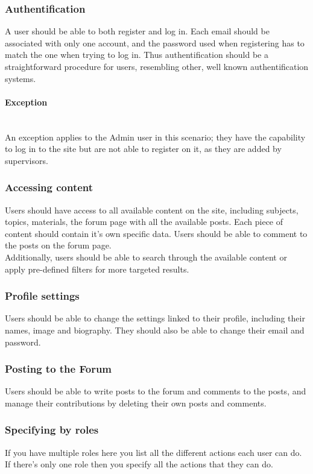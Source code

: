 \documentclass[12pt,a4paper]{article}
\begin{document}
\begin{spacing}{1.5}
    \subsubsection{Authentification}
    A user should be able to both register and log in. Each email should be
    associated with only one account, and the password used when registering has to
    match the one when trying to log in. Thus authentification should be a
    straightforward procedure for users, resembling other, well known
    authentification systems.
    \paragraph{Exception} \mbox{} \\ \indent An exception applies to the Admin user in
    this scenario; they have the capability to log in to the site but are not able
    to register on it, as they are added by supervisors.
    \subsubsection{Accessing content}
    Users should have access to all available content on the site, including
    subjects, topics, materials, the forum page with all the available posts. Each
    piece of content should contain it's own specific data. Users should be able to
    comment to the posts on the forum page. \\ \indent Additionally, users should
    be able to search through the available content or apply pre-defined filters
    for more targeted results.
    \subsubsection{Profile settings}
    Users should be able to change the settings linked to their profile, including
    their names, image and biography. They should also be able to change their
    email and password.
    \subsubsection{Posting to the Forum}
    Users should be able to write posts to the forum and comments to the posts, and
    manage their contributions by deleting their own posts and comments.
    \subsubsection{Specifying by roles}
    If you have multiple roles here you list all the different actions each user
    can do. If there's only one role then you specify all the actions that they can
    do.


\end{spacing}
\end{document}
